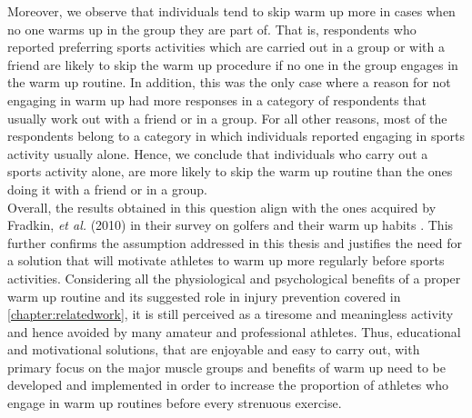 Moreover, we observe that individuals tend to skip warm up more in cases when no one warms up in the group they are part of. That is, respondents who reported preferring sports activities which are carried out in a group or with a friend are likely to skip the warm up procedure if no one in the group engages in the warm up routine. In addition, this was the only case where a reason for not engaging in warm up had more responses in a category of respondents that usually work out with a friend or in a group. For all other reasons, most of the respondents belong to a category in which individuals reported engaging in sports activity usually alone. Hence, we conclude that individuals who carry out a sports activity alone, are more likely to skip the warm up routine than the ones doing it with a friend or in a group.\\ Overall, the results obtained in this question align with the ones acquired by Fradkin, \textit{et al.} (2010) in their survey on golfers and their warm up habits \cite{fradkin2010effects}. This further confirms the assumption addressed in this thesis and justifies the need for a solution that will motivate athletes to warm up more regularly before sports activities. Considering all the physiological and psychological benefits of a proper warm up routine and its suggested role in injury prevention covered in \ref{chapter:relatedwork}, it is still perceived as a tiresome and meaningless activity and hence avoided by many amateur and professional athletes. Thus, educational and motivational solutions, that are enjoyable and easy to carry out, with primary focus on the major muscle groups and benefits of warm up need to be developed and implemented in order to increase the proportion of athletes who engage in warm up routines before every strenuous exercise.\\
